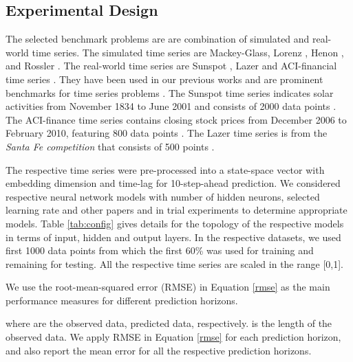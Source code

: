 \documentclass[final,5p,times,twocolumn]{elsarticle}
\begin{document}
\subsection{Experimental Design}
  
 
 

 The selected benchmark problems are are combination of simulated and real-world time series. The 
simulated time series are Mackey-Glass\cite{Mackey1977}, Lorenz 
\cite{lorenz1963}, Henon \cite{Henon1976}, and 
Rossler \cite{rossler}. The real-world time series are Sunspot  
\cite{Sunspot2001}, Lazer \cite{weigendtime} and ACI-financial time 
series \cite{timeDataSet}. They  have been used in our previous works and are prominent benchmarks for time series problems \cite{ChandraLangevinNC2019,ChandraTNNLS2015,chandra2017_CMTL}. The  
Sunspot 
time series indicates solar activities from November 1834 to June 2001 and consists of 2000 data 
points \cite{Sunspot2001}. The ACI-finance time series  contains
closing stock prices from December 2006 to February 2010,
featuring 800 data points \cite{timeDataSet}. The  
Lazer time 
series is from the  \textit{Santa Fe 
competition} that consists of 500 points \cite{weigendtime}. 


The respective time series were pre-processed into a state-space 
vector \cite{Takens1981} with embedding dimension
 and time-lag   for 10-step-ahead prediction. We considered respective  neural network models with  number of hidden 
neurons, selected learning rate and other papers and in trial experiments to determine appropriate models. Table \ref{tab:config} gives details for the topology of the respective models in terms of input, hidden and output layers.  In the respective datasets, we used first 1000 data points  from which the first 60\% was used for training and remaining for testing.   All the respective time series  are scaled in the range [0,1]. 
   
  
We use the root-mean-squared error (RMSE)  in Equation \ref{rmse}   as the main performance measures
for different prediction horizons. 
 
 
 
\noindent where    are the observed data,
predicted data, respectively.  is the length of the observed data. We apply RMSE in Equation 
\ref{rmse} for each 
prediction horizon, and also report  the mean error for all the 
respective prediction horizons.
 
 
 
\end{document}
